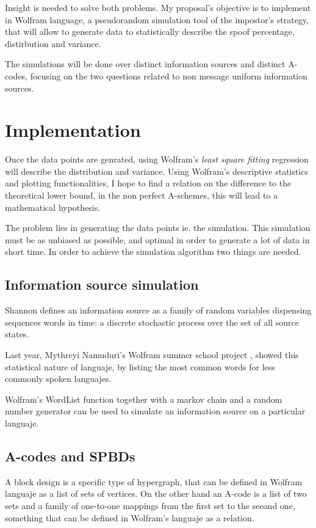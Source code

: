 \documentclass[conference]{IEEEtran}
\begin{document}
Insight is needed to solve both problems. My proposal's objective is to implement in Wolfram language, a pseudorandom simulation tool of the impostor's strategy, that will allow to generate data to statistically describe the spoof percentage, distirbution and variance.

The simulations will be done over distinct information sources and distinct A-codes, focusing on the two questions related to non message uniform information sources.

%
%
\section{Implementation}
Once the data points are genrated, using Wolfram's \textit{least square fitting} regression will describe the distribution and variance. Using Wolfram's descriptive statistics and plotting functionalities, I hope to find a relation on the difference to the theoretical lower bound, in the non perfect A-schemes, this will lead to a mathematical hypothesis.

The problem lies in generating the data points ie. the simulation. This simulation must be as unbiased as possible, and optimal in order to generate a lot of data in short time. In order to achieve the simulation algorithm two things are needed.

\subsection{Information source simulation}
Shannon defines an information source as a family of random variables dispensing sequences words in time: a discrete stochastic process over the set of all source states.

Last year, Mythreyi Namuduri's Wolfram summer school project \cite{b6}, showed this statistical nature of languaje, by listing the most common words for less commonly spoken languajes.

Wolfram's WordList function together with a markov chain and a random number generator can be used to simulate an information source on a particular languaje.

\subsection{A-codes and SPBDs}
A block design is a specific type of hypergraph, that can be defined in Wolfram languaje as a list of sets of vertices. On the other hand an A-code is a list of two sets and a family of one-to-one mappings from the first set to the second one, something that can be defined in Wolfram's languaje as a relation.
\end{document}
